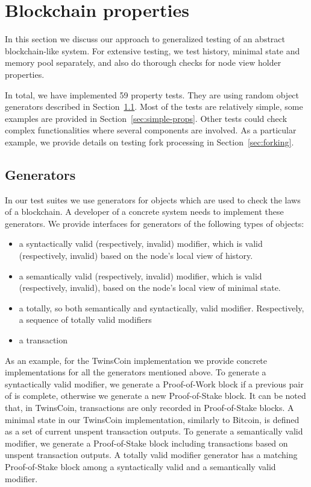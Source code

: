 
\section{Blockchain properties}
\label{sec:props}

In this section we discuss our approach to generalized testing of an abstract blockchain-like system. For extensive testing, we test history, minimal state and memory pool separately, and also do thorough checks for node view holder properties.
	
In total, we have implemented 59 property tests. They are using random object generators described in Section~\ref{sec:generators}. Most of the tests are relatively simple, some examples are provided in Section~\ref{sec:simple-props}. Other tests could check complex functionalities where several components are involved. As a particular example, we provide details on testing fork processing in Section~\ref{sec:forking}.

\subsection{Generators}
\label{sec:generators}

In our test suites we use generators for objects which are used to check the laws of a blockchain. A developer of a concrete system needs to implement these generators. We provide interfaces for generators of the following types of objects:

\begin{itemize}
	\item{a syntactically valid (respectively, invalid) modifier, which is valid (respectively, invalid) based on the node's local view of history.}
	\item{a semantically valid (respectively, invalid) modifier, which is valid (respectively, invalid), based on the node's local view of minimal state.}
	\item{a totally, so both semantically and syntactically, valid modifier. Respectively, a sequence of totally valid modifiers}
	\item{a transaction}
\end{itemize}

As an example, for the TwinsCoin implementation we provide concrete implementations for all the generators mentioned above. To generate a syntactically valid modifier, we generate a Proof-of-Work block if a previous pair of {\em<Proof-of-Work block, Proof-of-Stake block>} is complete, otherwise we generate a new Proof-of-Stake block. It can be noted that, in TwinsCoin, transactions are only recorded in Proof-of-Stake blocks. A minimal state in our TwinsCoin implementation, similarly to Bitcoin, is defined as a set of current unspent transaction outputs. To generate a semantically valid modifier, we generate a Proof-of-Stake block including transactions based on unspent transaction outputs. A totally valid modifier generator has a matching Proof-of-Stake block among a syntactically valid and a semantically valid modifier. 

